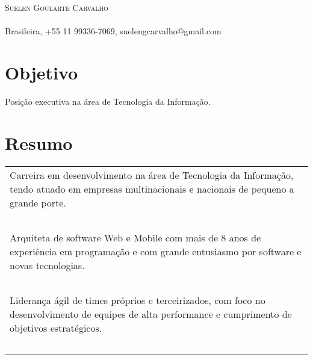 \documentclass[a4paper, oneside, final]{scrartcl}
\begin{document}
\begin{center}
\textsc{\Huge{Suelen Goularte Carvalho}}\\
\ \\
Brasileira, +55 11 99336-7069, suelengcarvalho@gmail.com


\section{Objetivo}
	Posição executiva na área de Tecnologia da Informação.



\section{Resumo}
\begin{tabularx}{1\linewidth}{X}
	Carreira em desenvolvimento na área de Tecnologia da Informação, tendo atuado em empresas multinacionais e nacionais de pequeno a grande porte. \\ \ \\

	Arquiteta de software Web e Mobile com mais de 8 anos de experiência em programação e com grande entusiasmo por software e novas tecnologias. \\ \ \\
		
	Liderança ágil de times próprios e terceirizados, com foco no desenvolvimento de equipes de alta performance e cumprimento de objetivos estratégicos. \\ \ \\
	

\end{tabularx}
\end{center}
\end{document}
